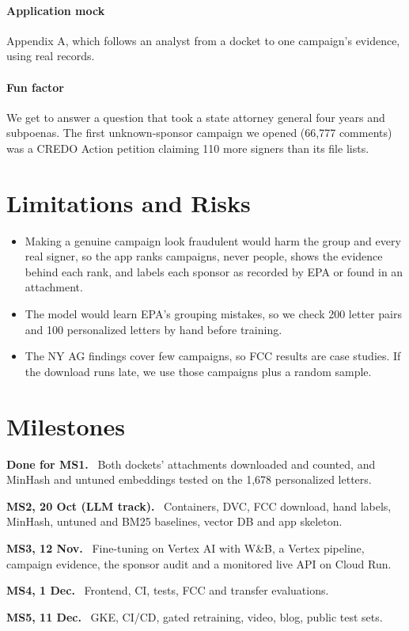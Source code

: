 \documentclass[10pt,twocolumn]{article}
\newcommand{\lead}[1]{\textbf{#1.}\ }
\begin{document}
\paragraph{Application mock} Appendix A, which follows an analyst from a docket to one
campaign's evidence, using real records.

\paragraph{Fun factor} We get to answer a question that took a state attorney general four years and
subpoenas. The first unknown-sponsor campaign we opened
(66{,}777 comments) was a CREDO Action petition claiming 110 more signers than its file lists.

\section{Limitations and Risks}

\begin{itemize}
  \item Making a genuine campaign look fraudulent would harm the group and every real signer, so the
        app ranks campaigns, never people, shows the evidence behind each rank, and labels each sponsor as
        recorded by EPA or found in an attachment.
  \item The model would learn EPA's grouping mistakes, so we check 200 letter pairs and 100
        personalized letters by hand before training.
  \item The NY AG findings cover few campaigns, so FCC results are case studies. If the download runs late, we use those
        campaigns plus a random sample.
\end{itemize}

\section{Milestones}

\begin{leads}
  \item \lead{Done for MS1} Both dockets' attachments downloaded and counted, and MinHash and
        untuned embeddings tested on the 1{,}678 personalized letters.
  \item \lead{MS2, 20 Oct (LLM track)} Containers, DVC, FCC download, hand labels, MinHash,
        untuned and BM25 baselines, vector DB and app skeleton.
  \item \lead{MS3, 12 Nov} Fine-tuning on Vertex AI with W\&B, a Vertex pipeline, campaign
        evidence, the sponsor audit and a monitored live API on Cloud Run.
  \item \lead{MS4, 1 Dec} Frontend, CI, tests, FCC and transfer evaluations.
  \item \lead{MS5, 11 Dec} GKE, CI/CD, gated retraining, video, blog, public test sets.
\end{leads}
\end{document}

